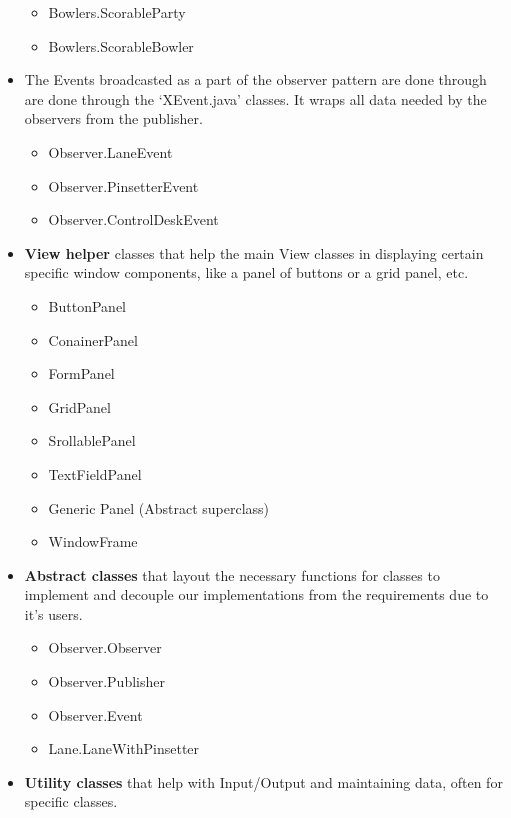 \begin{itemize}
          \begin{itemize}
            \item Bowlers.ScorableParty
            \item Bowlers.ScorableBowler
          \end{itemize}
    \item The Events broadcasted as a part of the observer pattern are done through are done through the `XEvent.java' classes. It wraps all data needed by the observers from the publisher.
          \begin{itemize}
              \item Observer.LaneEvent
              \item Observer.PinsetterEvent
              \item Observer.ControlDeskEvent
          \end{itemize}
    \item \textbf{View helper} classes that help the main View classes in displaying certain specific window components, like a panel of buttons or a grid panel, etc.
          \begin{itemize}
              \item ButtonPanel
              \item ConainerPanel
              \item FormPanel
              \item GridPanel
              \item SrollablePanel
              \item TextFieldPanel
              \item Generic Panel (Abstract superclass)
              \item WindowFrame
          \end{itemize}
    \item \textbf{Abstract classes} that layout the necessary functions for classes to implement and decouple our implementations from the requirements due to it's users.
          \begin{itemize}
              \item Observer.Observer
              \item Observer.Publisher
              \item Observer.Event
              \item Lane.LaneWithPinsetter
          \end{itemize}
    \item \textbf{Utility classes} that help with Input/Output and maintaining data, often for specific classes.

\end{itemize}
